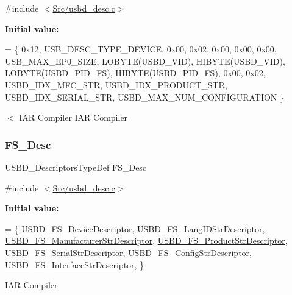 {\ttfamily \#include $<$\mbox{\hyperlink{usbd__desc_8c}{Src/usbd\+\_\+desc.\+c}}$>$}

{\bfseries Initial value\+:}
\begin{DoxyCode}
=
  \{
    0x12,                       
    USB\_DESC\_TYPE\_DEVICE,       
    0x00,                         
    0x02,
    0x00,                       
    0x00,                       
    0x00,                       
    USB\_MAX\_EP0\_SIZE,          
    LOBYTE(USBD\_VID),           
    HIBYTE(USBD\_VID),           
    LOBYTE(USBD\_PID\_FS),           
    HIBYTE(USBD\_PID\_FS),           
    0x00,                       
    0x02,
    USBD\_IDX\_MFC\_STR,           
    USBD\_IDX\_PRODUCT\_STR,       
    USBD\_IDX\_SERIAL\_STR,        
    USBD\_MAX\_NUM\_CONFIGURATION  
  \}
\end{DoxyCode}
$<$ I\+AR Compiler I\+AR Compiler \mbox{\label{group___u_s_b_d___d_e_s_c___private___variables_gae36d67393118d9d8531a8d633e23a797}} 
\subsubsection{\texorpdfstring{F\+S\+\_\+\+Desc}{FS\_Desc}}
{\footnotesize\ttfamily U\+S\+B\+D\+\_\+\+Descriptors\+Type\+Def F\+S\+\_\+\+Desc}



{\ttfamily \#include $<$\mbox{\hyperlink{usbd__desc_8c}{Src/usbd\+\_\+desc.\+c}}$>$}

{\bfseries Initial value\+:}
\begin{DoxyCode}
=
\{
  \mbox{\hyperlink{group___u_s_b_d___d_e_s_c___private___functions_ga14798be38c08a37163e53167032485ff}{USBD\_FS\_DeviceDescriptor}},
  \mbox{\hyperlink{group___u_s_b_d___d_e_s_c___private___functions_gac02628ceb6a6a071e192dcb85063c0cc}{USBD\_FS\_LangIDStrDescriptor}}, 
  \mbox{\hyperlink{group___u_s_b_d___d_e_s_c___private___functions_ga6427a671827813efe1a46c3dfcb05683}{USBD\_FS\_ManufacturerStrDescriptor}},
  \mbox{\hyperlink{group___u_s_b_d___d_e_s_c___private___functions_ga0ec558c0303daabb851d584109a56514}{USBD\_FS\_ProductStrDescriptor}},
  \mbox{\hyperlink{group___u_s_b_d___d_e_s_c___private___functions_gaad2a1d1451821845eda602a82b1cd213}{USBD\_FS\_SerialStrDescriptor}},
  \mbox{\hyperlink{group___u_s_b_d___d_e_s_c___private___functions_ga40ed2a0fb60c50a285983a09ba6921d6}{USBD\_FS\_ConfigStrDescriptor}},
  \mbox{\hyperlink{group___u_s_b_d___d_e_s_c___private___functions_gab248f43276f92d982ab5853111e4fb10}{USBD\_FS\_InterfaceStrDescriptor}},
\}
\end{DoxyCode}
I\+AR Compiler 